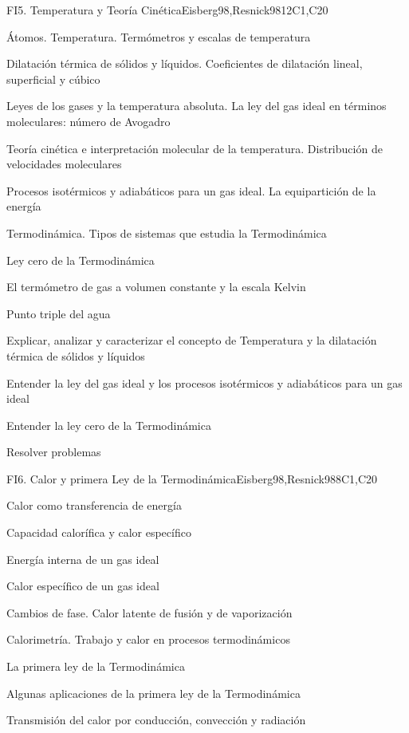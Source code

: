 \begin{syllabus}
\begin{unit}{FI5. Temperatura y Teoría Cinética}{Eisberg98,Resnick98}{}{12}{C1,C20}
\begin{topics}
         \item  Átomos. Temperatura. Termómetros y escalas de temperatura
	 \item  Dilatación térmica de sólidos y líquidos. Coeficientes de dilatación lineal, superficial y cúbico
         \item  Leyes de los gases y la temperatura absoluta. La ley del gas ideal en términos moleculares: número de Avogadro
	 \item  Teoría cinética e interpretación molecular de la temperatura. Distribución de velocidades moleculares
         \item  Procesos isotérmicos y adiabáticos para un gas ideal. La equipartición de la energía
	 \item  Termodinámica. Tipos de sistemas que estudia la Termodinámica
         \item  Ley cero de la Termodinámica
	 \item  El termómetro de gas a volumen constante y la escala Kelvin
         \item  Punto triple del agua
   \end{topics}

   \begin{learningoutcomes}
         \item  Explicar, analizar y caracterizar el concepto de Temperatura y la dilatación térmica de sólidos y líquidos
         \item  Entender la ley del gas ideal y los procesos isotérmicos y adiabáticos para un gas ideal
         \item  Entender la ley cero de la Termodinámica
         \item  Resolver problemas
   \end{learningoutcomes}
\end{unit}

\begin{unit}{FI6. Calor y primera Ley de la Termodinámica}{}{Eisberg98,Resnick98}{8}{C1,C20}
\begin{topics}
         \item  Calor como transferencia de energía
	 \item  Capacidad calorífica y calor específico
         \item  Energía interna de un gas ideal
	 \item  Calor específico de un gas ideal
         \item  Cambios de fase. Calor latente de fusión y de vaporización
	 \item  Calorimetría. Trabajo y calor en procesos termodinámicos
         \item  La primera ley de la Termodinámica
	 \item  Algunas aplicaciones de la primera ley de la Termodinámica
         \item  Transmisión del calor por conducción, convección y radiación
   \end{topics}


\end{unit}
\end{syllabus}

